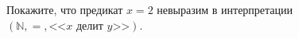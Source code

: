 Покажите, что предикат $x = 2$ невыразим в интерпретации $(\mathbb{N}, =, \text{<<$x$ делит $y$>>})$.